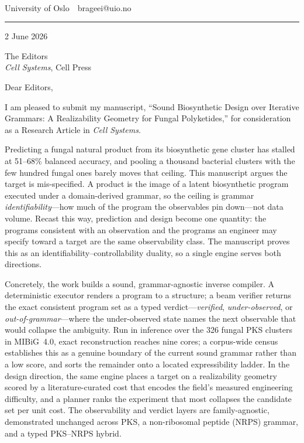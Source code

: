\documentclass[11pt]{article}
\begin{document}
\\[2pt]
{\small University of Oslo \,\textbar\, brageei@uio.no}\\[-5pt]
\noindent\rule{\linewidth}{0.4pt}

\vspace{8pt}
\hfill 2 June 2026

\vspace{4pt}
\noindent The Editors\\
\textit{Cell Systems}, Cell Press

\vspace{10pt}
\noindent Dear Editors,

I am pleased to submit my manuscript, ``Sound Biosynthetic Design over Iterative Grammars: A
Realizability Geometry for Fungal Polyketides,'' for consideration as a Research Article in
\textit{Cell Systems}.

Predicting a fungal natural product from its biosynthetic gene cluster has stalled at 51--68\%
balanced accuracy, and pooling a thousand bacterial clusters with the few hundred fungal ones barely
moves that ceiling. This manuscript argues the target is mis-specified. A product is the image of a
latent biosynthetic program executed under a domain-derived grammar, so the ceiling is grammar
\emph{identifiability}---how much of the program the observables pin down---not data volume. Recast
this way, prediction and design become one quantity: the programs consistent with an observation and
the programs an engineer may specify toward a target are the same observability class. The manuscript
proves this as an identifiability--controllability duality, so a single engine serves both directions.

Concretely, the work builds a sound, grammar-agnostic inverse compiler. A deterministic executor
renders a program to a structure; a beam verifier returns the exact consistent program set as a typed
verdict---\emph{verified}, \emph{under-observed}, or \emph{out-of-grammar}---where the under-observed
state names the next observable that would collapse the ambiguity. Run in inference over the 326 fungal
PKS clusters in MIBiG~4.0, exact reconstruction reaches nine cores; a corpus-wide census establishes
this as a genuine boundary of the current sound grammar rather than a low score, and sorts the
remainder onto a located expressibility ladder. In the design direction, the same engine places a
target on a realizability geometry scored by a literature-curated cost that encodes the field's
measured engineering difficulty, and a planner ranks the experiment that most collapses the candidate
set per unit cost. The observability and verdict layers are family-agnostic, demonstrated unchanged
across PKS, a non-ribosomal peptide (NRPS) grammar, and a typed PKS--NRPS hybrid.
\end{document}
